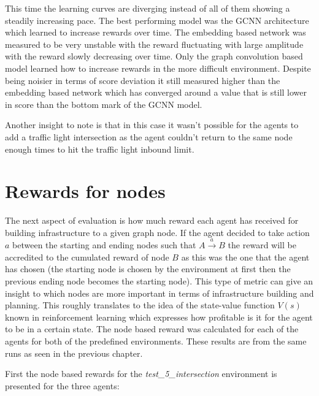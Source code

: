\documentclass[
]{elteikthesis}[2023/04/10]
\begin{document}
This time the learning curves are diverging instead of all of them showing a steadily
increasing pace. The best performing model was the GCNN architecture
which learned to increase rewards over time. The embedding based network
was measured to be very unstable with the reward fluctuating with large
amplitude with the reward slowly decreasing over time. 
Only the graph convolution based model learned how to increase
rewards in the more difficult environment. Despite being noisier in
terms of score deviation it still measured higher than the embedding
based network which has converged around a value that is still lower
in score than the bottom mark of the GCNN model. 

Another insight to note is that in this case it wasn't possible for
the agents to add a traffic light intersection as the agent couldn't
return to the same node enough times to hit the traffic light inbound limit.

\section{Rewards for nodes}

The next aspect of evaluation is how much reward each agent has received
for building infrastructure to a given graph node. If the agent decided
to take action $a$ between the starting and ending nodes such that
$A\overset{a}{\rightarrow}B$ the reward will be accredited to the
cumulated reward of node $B$ as this was the one that the agent has
chosen (the starting node is chosen by the environment at first then
the previous ending node becomes the starting node). This type of
metric can give an insight to which nodes are more important in terms
of infrastructure building and planning. This roughly translates to
the idea of the state-value function $V(s)$ known in reinforcement
learning which expresses how profitable is it for the agent to be
in a certain state. The node based reward was calculated for each
of the agents for both of the predefined environments. These results
are from the same runs as seen in the previous chapter.

First the node based rewards for the \emph{test\_5\_intersection}
environment is presented for the three agents:
\end{document}
